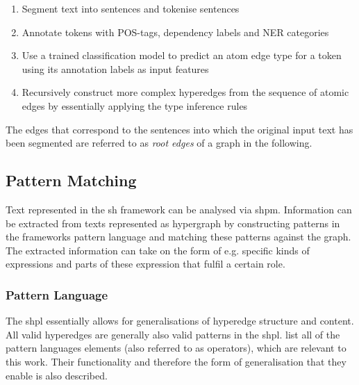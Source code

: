 \documentclass[11pt, numbers=noenddot]{scrreprt}
\begin{document}
\begin{enumerate}
	\item Segment text into sentences and tokenise sentences
	\item Annotate tokens with POS-tags, dependency labels and NER categories
	\item Use a trained classification model to predict an atom edge type for a token using its annotation labels as input features
	\item Recursively construct more complex hyperedges from the sequence of atomic edges by essentially applying the type inference rules
\end{enumerate}

The edges that correspond to the sentences into which the original input text has been segmented are referred to as \textit{root edges} of a graph in the following. 


\subsection{Pattern Matching}
\label{sec:sh-pattern-matching}
Text represented in the \gls{sh} framework can be analysed via \gls{shpm}. Information can be extracted from texts represented as hypergraph by constructing patterns in the frameworks pattern language and matching these patterns against the graph. The extracted information can take on the form of e.g. specific kinds of expressions and parts of these expression that fulfil a certain role.


\subsubsection{Pattern Language}
\label{sec:sh-pattern-language}
The \gls{shpl} essentially allows for generalisations of hyperedge structure and content. All valid hyperedges are generally also valid patterns in the \gls{shpl}.  list all of the pattern languages elements (also referred to as operators), which are relevant to this work. Their functionality and therefore the form of generalisation that they enable is also described.
\end{document}
